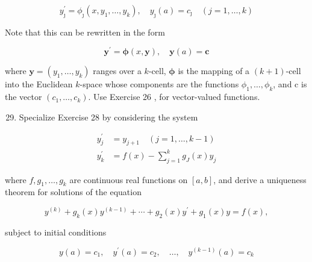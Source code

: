 \documentclass[10pt]{article}
\begin{document}
$$
y_{\jmath}^{\prime}=\phi_{\jmath}\left(x, y_{1}, \ldots, y_{k}\right), \quad y_{\jmath}(a)=c_{\jmath} \quad(j=1, \ldots, k)
$$

Note that this can be rewritten in the form

$$
\mathbf{y}^{\prime}=\boldsymbol{\phi}(x, \mathbf{y}), \quad \mathbf{y}(a)=\mathbf{c}
$$

where $\mathbf{y}=\left(y_{1}, \ldots, y_{k}\right)$ ranges over a $k$-cell, $\boldsymbol{\phi}$ is the mapping of a $(k+1)$-cell into the Euclidean $k$-space whose components are the functions $\phi_{1}, \ldots, \phi_{k}$, and $\mathrm{c}$ is the vector $\left(c_{1}, \ldots, c_{k}\right)$. Use Exercise 26 , for vector-valued functions.

\begin{enumerate}
  \setcounter{enumi}{28}
  \item Specialize Exercise 28 by considering the system
\end{enumerate}

$$
\begin{aligned}
y_{j}^{\prime} & =y_{j+1} \quad(j=1, \ldots, k-1) \\
y_{k}^{\prime} & =f(x)-\sum_{j=1}^{k} g_{J}(x) y_{j}
\end{aligned}
$$

where $f, g_{1}, \ldots, g_{k}$ are continuous real functions on $[a, b]$, and derive a uniqueness theorem for solutions of the equation

$$
y^{(k)}+g_{k}(x) y^{(k-1)}+\cdots+g_{2}(x) y^{\prime}+g_{1}(x) y=f(x),
$$

subject to initial conditions

$$
y(a)=c_{1}, \quad y^{\prime}(a)=c_{2}, \quad \ldots, \quad y^{(k-1)}(a)=c_{k}
$$
\end{document}
